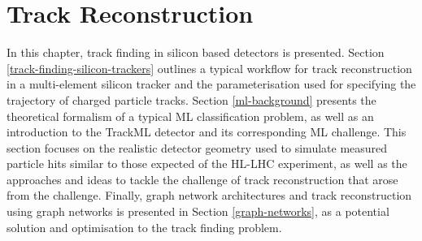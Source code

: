 
\doublespacing

\chapter{Track Reconstruction}
\label{chapter-3}




In this chapter, track finding in silicon based detectors is presented. Section \ref{track-finding-silicon-trackers} outlines a typical workflow for track reconstruction in a multi-element silicon tracker and the parameterisation used for specifying the trajectory of charged particle tracks. Section \ref{ml-background} presents the theoretical formalism of a typical ML classification problem, as well as an introduction to the TrackML detector and its corresponding ML challenge. This section focuses on the realistic detector geometry used to simulate measured particle hits similar to those expected of the HL-LHC experiment, as well as the approaches and ideas to tackle the challenge of track reconstruction that arose from the challenge. Finally, graph network architectures and track reconstruction using graph networks is presented in Section \ref{graph-networks}, as a potential solution and optimisation to the track finding problem.


